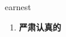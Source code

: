 
\begin{frame}
{\huge earnest}
\begin{center}
\begin{enumerate}\Large
  \item \textbf{严肃认真的}
\end{enumerate}
\end{center}
\end{frame}
